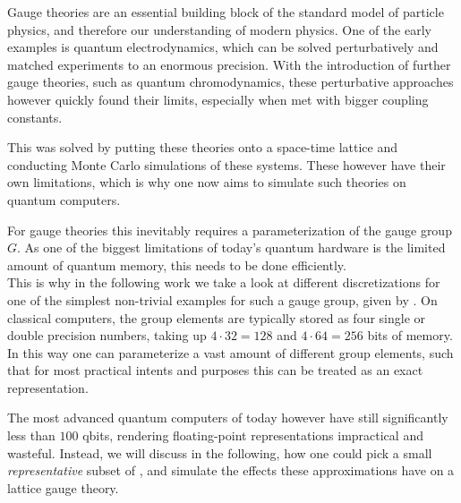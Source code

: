 
Gauge theories are an essential building block of the standard model of particle physics, and therefore our understanding of modern physics. One of the early examples is quantum electrodynamics, which can be solved perturbatively and matched experiments to an enormous precision. With the introduction of further gauge theories, such as quantum chromodynamics, these perturbative approaches however quickly found their limits, especially when met with bigger coupling constants.

This was solved by putting these theories onto a space-time lattice and conducting Monte Carlo simulations of these systems. These however have their own limitations, which is why one now aims to simulate such theories on quantum computers.

For gauge theories this inevitably requires a parameterization of the gauge group $G$. As one of the biggest limitations of today's quantum hardware is the limited amount of quantum memory, this needs to be done efficiently.\\

This is why in the following work we take a look at different discretizations for one of the simplest non-trivial examples for such a gauge group, given by \SUTwo. On classical computers, the group elements are typically stored as four single or double precision numbers, taking up $4 \cdot 32 = 128$ and $4 \cdot 64 = 256$ bits of memory. In this way one can parameterize a vast amount of different group elements, such that for most practical intents and purposes this can be treated as an exact representation.

The most advanced quantum computers of today however have still significantly less than $100$ qbits, rendering floating-point representations impractical and wasteful. Instead, we will discuss in the following, how one could pick a small \emph{representative} subset of \SUTwo, and simulate the effects these approximations have on a lattice gauge theory.
